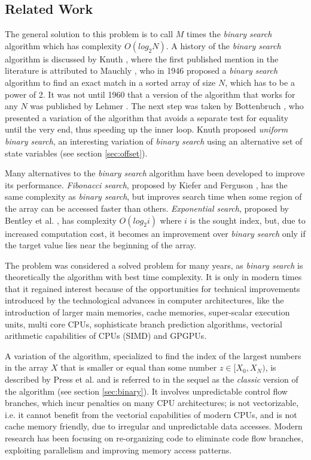 \documentclass[preprint,1p,times]{elsarticle}
\begin{document}
\subsection{Related Work}
\label{sec:relatedwork}
The general solution to this problem is to call $M$ times the \textit{binary search} algorithm which has complexity $O\left(log_2N\right)$. A history of the \textit{binary search} algorithm is discussed by Knuth \cite{Knuth1997}, where the first published mention in the literature is attributed to Mauchly \cite{Mauchly1946}, who in 1946 proposed a \textit{binary search} algorithm to find an exact match in a sorted array of size $N$, which has to be a power of 2. It was not until 1960 that a version of the algorithm that works for any $N$ was published by Lehmer \cite{Lehmer1960}. The next step was taken by Bottenbruch \cite{Bottenbruch1962}, who presented a variation of the algorithm that avoids a separate test for equality until the very end, thus speeding up the inner loop. Knuth \cite{Knuth1997} proposed \textit{uniform binary search}, an interesting variation of \textit{binary search} using an alternative set of state variables (see section \ref{sec:offset}).
 
Many alternatives to the \textit{binary search} algorithm have been developed to improve its performance. \textit{Fibonacci search}, proposed by Kiefer \cite{Kiefer1953} and Ferguson \cite{Ferguson1960}, has the same complexity as \textit{binary search}, but improves search time when some region of the array can be accessed faster than others. \textit{Exponential search}, proposed by Bentley et al. \cite{Bentley1976}, has complexity $O\left(log_2i\right)$ where $i$ is the sought index, but, due to increased computation cost, it becomes an improvement over \textit{binary search} only if the target value lies near the beginning of the array. 

The problem was considered a solved problem for many years, as \textit{binary search} is theoretically the algorithm with best time complexity. It is only in modern times that it regained interest because of the opportunities for technical improvements introduced by the technological advances in computer architectures, like the introduction of larger main memories, cache memories, super-scalar execution units, multi core CPUs, sophisticate branch prediction algorithms, vectorial arithmetic capabilities of CPUs (SIMD) and GPGPUs.

A variation of the algorithm, specialized to find the index of the largest numbers in the array $X$ that is smaller or equal than some number $z\in[X_0,X_N)$, is described by Press et al. \cite{NRC++} and is referred to in the sequel as the \textit{classic} version of the algorithm (see section \ref{sec:binary}). It involves unpredictable control flow branches, which incur penalties on many CPU architectures; is not vectorizable, i.e. it cannot benefit from the vectorial capabilities of modern CPUs, and is not cache memory friendly, due to irregular and unpredictable data accesses. Modern research has been focusing on re-organizing code to eliminate code flow branches, exploiting parallelism and improving memory access patterns.
\end{document}

